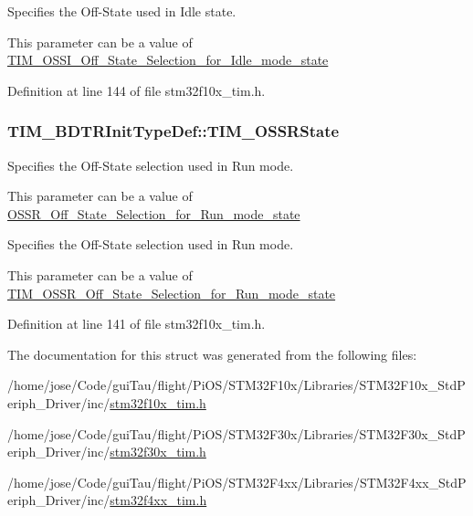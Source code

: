 \begin{DoxyVerb}        Specifies the Off-State used in Idle state.
\end{DoxyVerb}
 This parameter can be a value of \hyperlink{group___t_i_m___o_s_s_i___off___state___selection__for___idle__mode__state}{T\-I\-M\-\_\-\-O\-S\-S\-I\-\_\-\-Off\-\_\-\-State\-\_\-\-Selection\-\_\-for\-\_\-\-Idle\-\_\-mode\-\_\-state} 

Definition at line 144 of file stm32f10x\-\_\-tim.\-h.

\hypertarget{struct_t_i_m___b_d_t_r_init_type_def_a8f34ad7bc4764bd3ff372cadde468072}{
\subsubsection[{T\-I\-M\-\_\-\-O\-S\-S\-R\-State}]{ T\-I\-M\-\_\-\-B\-D\-T\-R\-Init\-Type\-Def\-::\-T\-I\-M\-\_\-\-O\-S\-S\-R\-State}}\label{struct_t_i_m___b_d_t_r_init_type_def_a8f34ad7bc4764bd3ff372cadde468072}
\begin{DoxyVerb}        Specifies the Off-State selection used in Run mode.
\end{DoxyVerb}
 This parameter can be a value of \hyperlink{group___o_s_s_r___off___state___selection__for___run__mode__state}{O\-S\-S\-R\-\_\-\-Off\-\_\-\-State\-\_\-\-Selection\-\_\-for\-\_\-\-Run\-\_\-mode\-\_\-state}

\begin{DoxyVerb}        Specifies the Off-State selection used in Run mode.
\end{DoxyVerb}
 This parameter can be a value of \hyperlink{group___t_i_m___o_s_s_r___off___state___selection__for___run__mode__state}{T\-I\-M\-\_\-\-O\-S\-S\-R\-\_\-\-Off\-\_\-\-State\-\_\-\-Selection\-\_\-for\-\_\-\-Run\-\_\-mode\-\_\-state} 

Definition at line 141 of file stm32f10x\-\_\-tim.\-h.



The documentation for this struct was generated from the following files\-:\begin{DoxyCompactItemize}
\item 
/home/jose/\-Code/gui\-Tau/flight/\-Pi\-O\-S/\-S\-T\-M32\-F10x/\-Libraries/\-S\-T\-M32\-F10x\-\_\-\-Std\-Periph\-\_\-\-Driver/inc/\hyperlink{stm32f10x__tim_8h}{stm32f10x\-\_\-tim.\-h}\item 
/home/jose/\-Code/gui\-Tau/flight/\-Pi\-O\-S/\-S\-T\-M32\-F30x/\-Libraries/\-S\-T\-M32\-F30x\-\_\-\-Std\-Periph\-\_\-\-Driver/inc/\hyperlink{stm32f30x__tim_8h}{stm32f30x\-\_\-tim.\-h}\item 
/home/jose/\-Code/gui\-Tau/flight/\-Pi\-O\-S/\-S\-T\-M32\-F4xx/\-Libraries/\-S\-T\-M32\-F4xx\-\_\-\-Std\-Periph\-\_\-\-Driver/inc/\hyperlink{stm32f4xx__tim_8h}{stm32f4xx\-\_\-tim.\-h}\end{DoxyCompactItemize}
